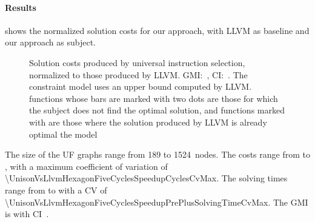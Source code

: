 \paragraph{Results}



 shows the normalized \gls{solution} costs
for our approach, with \gls{LLVM} as \gls{baseline} and our approach as
\gls{subject}.
%
\begin{figure}
  \centering%
  \maxsizebox{\textwidth}{!}{%
    \trimBarchartPlot{%
    }%
  }

  \caption[%
            Plot for evaluating universal instruction selection's impact on code
            quality in comparison with LLVM%
          ]%
          {%
            Solution costs produced by universal instruction selection,
            normalized to those produced by LLVM.
            GMI:~\printGMI{%
              \UnisonVsLlvmHexagonFiveCyclesSpeedupCyclesRegularSpeedupGmean%
            },
            CI:~\printGMICI{%
              \UnisonVsLlvmHexagonFiveCyclesSpeedupCyclesRegularSpeedupCiMin%
            }{%
              \UnisonVsLlvmHexagonFiveCyclesSpeedupCyclesRegularSpeedupCiMax%
            }.
            The constraint model uses an upper bound computed by LLVM.
            \Glspl{function} whose bars are marked with two dots are those for
            which the \gls{subject} does not find the optimal solution, and
            \glspl{function} marked with \barNormValueNoSolution{} are those
            where the solution produced by \gls{LLVM} is already optimal \wrt
            the model%
          }
\end{figure}
%
The size of the \glspl{UF graph} range from \num{189} to
\num{1524}~\glspl{node}.
%
The costs range from
\printCycles{\UnisonVsLlvmHexagonFiveCyclesSpeedupCyclesAvgMin} to
\printCycles{\UnisonVsLlvmHexagonFiveCyclesSpeedupCyclesAvgMax}, with a maximum
coefficient of variation of
\num{\UnisonVsLlvmHexagonFiveCyclesSpeedupCyclesCvMax}.
%
The solving times range from
\printSolvingTime{\UnisonVsLlvmHexagonFiveCyclesSpeedupPrePlusSolvingTimeAvgMin}
to
\printSolvingTime{\UnisonVsLlvmHexagonFiveCyclesSpeedupPrePlusSolvingTimeAvgMax}
with a \gls{CV} of
\num{\UnisonVsLlvmHexagonFiveCyclesSpeedupPrePlusSolvingTimeCvMax}.
%
The \gls{GMI} is \printGMI{%
  \UnisonVsLlvmHexagonFiveCyclesSpeedupCyclesRegularSpeedupGmean%
} with \gls{CI}~\printGMICI{%
  \UnisonVsLlvmHexagonFiveCyclesSpeedupCyclesRegularSpeedupCiMin%
}{%
  \UnisonVsLlvmHexagonFiveCyclesSpeedupCyclesRegularSpeedupCiMax%
}.

